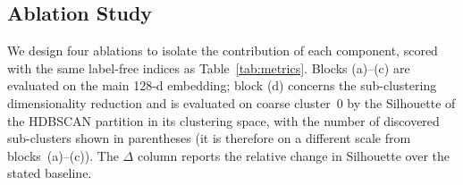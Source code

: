 \documentclass[10pt,a4paper,twocolumn]{article}
\begin{document}

\subsection{Ablation Study}
We design four ablations to isolate the contribution of each component, scored with the same label-free indices as Table~\ref{tab:metrics}. Blocks (a)--(c) are evaluated on the main 128-d embedding; block (d) concerns the sub-clustering dimensionality reduction and is evaluated on coarse cluster~0 by the Silhouette of the HDBSCAN partition in its clustering space, with the number of discovered sub-clusters shown in parentheses (it is therefore on a different scale from blocks~(a)--(c)). The $\Delta$ column reports the relative change in Silhouette over the stated baseline.

\begin{table}[t]
\centering
\caption{Ablation under label-free indices (Silh.\,$\uparrow$, DBI\,$\downarrow$, CHI\,$\uparrow$). $\Delta$ = relative Silhouette change. Block~(d) reports clustering-space Silhouette on cluster~0 (sub-count in parentheses); not comparable to (a)--(c).}
\label{tab:ablation}
\end{table}
\end{document}
